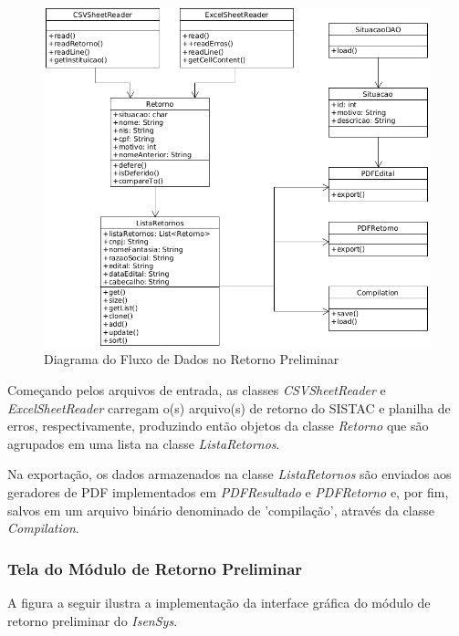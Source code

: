 \documentclass[
	12pt,			%
	openright,		%
	oneside,	
	a4paper,		%
	english,		%
	brazil			%
]{abntex2/abntex2}  %
\begin{document}
					\begin{figure}[H]
						\begin{center}
							
							\caption{Diagrama do Fluxo de Dados no Retorno Preliminar}
							\label{preliminar-fluxo}
							
							\includegraphics[scale=0.5]{img/retorno-prelim-uml}
							
						\end{center}
					\end{figure}
	
					Começando pelos arquivos de entrada, as classes \textit{CSVSheetReader} e \textit{ExcelSheetReader} carregam o(s) arquivo(s) de retorno do SISTAC e planilha de erros, respectivamente, produzindo então objetos da classe \textit{Retorno} que são agrupados em uma lista na classe \textit{ListaRetornos}.
	
					Na exportação, os dados armazenados na classe \textit{ListaRetornos} são enviados aos geradores de PDF implementados em \textit{PDFResultado} e \textit{PDFRetorno} e, por fim, salvos em um arquivo binário denominado de 'compilação', através da classe \textit{Compilation}.
	
				\subsubsection{Tela do Módulo de Retorno Preliminar}
	
					A figura a seguir ilustra a implementação da interface gráfica do módulo de retorno preliminar do \textit{IsenSys}.
	
\end{document}
